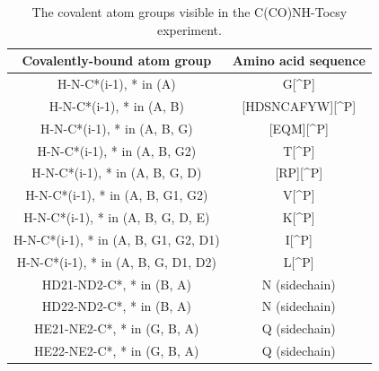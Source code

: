 \begin{table}
  \begin{tabular}{ | c | c | }
    \hline
    Covalently-bound atom group         &  Amino acid sequence  \\  \hline
    H-N-C*(i-1), * in (A)               &  G[\^{}P]             \\  \hline
    H-N-C*(i-1), * in (A, B)            &  [HDSNCAFYW][\^{}P]   \\  \hline
    H-N-C*(i-1), * in (A, B, G)         &  [EQM][\^{}P]         \\  \hline
    H-N-C*(i-1), * in (A, B, G2)        &  T[\^{}P]             \\  \hline
    H-N-C*(i-1), * in (A, B, G, D)      &  [RP][\^{}P]          \\  \hline
    H-N-C*(i-1), * in (A, B, G1, G2)    &  V[\^{}P]             \\  \hline
    H-N-C*(i-1), * in (A, B, G, D, E)   &  K[\^{}P]             \\  \hline
    H-N-C*(i-1), * in (A, B, G1, G2, D1)&  I[\^{}P]             \\  \hline
    H-N-C*(i-1), * in (A, B, G, D1, D2) &  L[\^{}P]             \\  \hline
    HD21-ND2-C*, * in (B, A)            &  N (sidechain)            \\  \hline
    HD22-ND2-C*, * in (B, A)            &  N (sidechain)            \\  \hline
    HE21-NE2-C*, * in (G, B, A)         &  Q (sidechain)            \\  \hline
    HE22-NE2-C*, * in (G, B, A)         &  Q (sidechain)            \\  \hline
  \end{tabular}
  \caption{The covalent atom groups visible in the C(CO)NH-Tocsy experiment.}
  \label{cconh_peaktypes}
\end{table}

